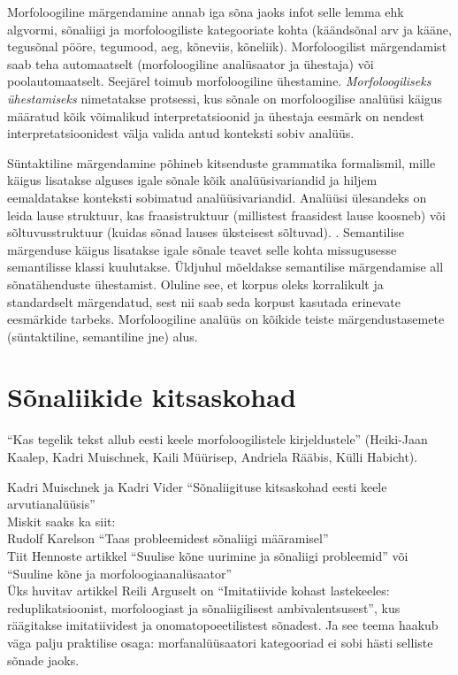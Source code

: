 \documentclass[12pt]{article}
\begin{document}
Morfoloogiline märgendamine annab iga sõna jaoks infot selle lemma ehk algvormi, sõnaliigi ja morfoloogiliste kategooriate kohta (käändsõnal arv ja kääne, tegusõnal pööre, tegumood, aeg, kõneviis, kõneliik). Morfoloogilist märgendamist saab teha automaatselt (morfoloogiline analüsaator ja ühestaja) või poolautomaatselt. Seejärel toimub morfoloogiline ühestamine. \emph{Morfoloogiliseks ühestamiseks} nimetatakse protsessi, kus sõnale on morfoloogilise analüüsi käigus määratud kõik võimalikud interpretatsioonid ja ühestaja eesmärk on nendest interpretatsioonidest välja valida antud konteksti sobiv analüüs.\citep{KV}

Süntaktiline märgendamine põhineb kitsenduste grammatika formalismil, mille käigus lisatakse alguses igale sõnale kõik analüüsivariandid ja hiljem eemaldatakse konteksti sobimatud analüüsivariandid. Analüüsi ülesandeks on leida lause struktuur, kas fraasistruktuur (millistest fraasidest lause koosneb) või sõltuvusstruktuur (kuidas sõnad lauses üksteisest sõltuvad). \citep[13, 17]{M2000}. Semantilise märgenduse käigus lisatakse igale sõnale teavet selle kohta missugusesse semantilisse klassi kuulutakse. Üldjuhul mõeldakse semantilise
märgendamise all sõnatähenduste ühestamist. Oluline see, et korpus oleks korralikult ja standardselt märgendatud,
sest nii saab seda korpust kasutada erinevate eesmärkide tarbeks. Morfoloogiline analüüs on kõikide teiste märgendustasemete (süntaktiline, semantiline jne) alus. \citep[13--14]{KR}

\section{Sõnaliikide kitsaskohad}

``Kas tegelik tekst allub eesti keele morfoloogilistele kirjeldustele'' (Heiki-Jaan Kaalep, Kadri Muischnek, Kaili Müürisep, Andriela Rääbis, Külli Habicht).

Kadri Muischnek ja Kadri Vider ``Sõnaliigituse kitsaskohad eesti keele arvutianalüüsis''\\
Miskit saaks ka siit:\\
Rudolf Karelson ``Taas probleemidest sõnaliigi määramisel''\\
Tiit Hennoste artikkel ``Suulise kõne uurimine ja sõnaliigi probleemid'' või ``Suuline kõne ja morfoloogiaanalüsaator''\\ 

Üks huvitav artikkel Reili Arguselt on ``Imitatiivide kohast lastekeeles: reduplikatsioonist, morfoloogiast ja sõnaliigilisest ambivalentsusest'', kus räägitakse imitatiividest ja onomatopoeetilistest sõnadest. Ja see teema haakub väga palju praktilise osaga: morfanalüüsaatori kategooriad ei sobi hästi selliste sõnade jaoks.
\end{document}
